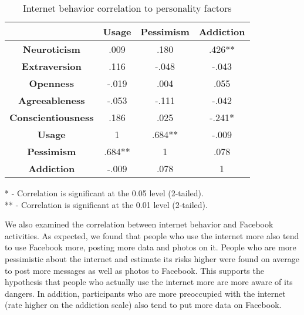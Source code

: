 \documentclass{sig-alternate}
\begin{document}
\begin{table}
\begin{center}
\begin{tabular}{|c|c|c|c|}
\hline
&  \textbf{Usage} & \textbf{Pessimism} & \textbf{Addiction} \\
\hline
\hline
\textbf{Neuroticism} &  .009	& .180	& .426**\\
\hline
\textbf{Extraversion} & .116	& -.048	& -.043\\
\hline
\textbf{Openness} & -.019	& .004	& .055  \\
\hline
\textbf{Agreeableness} & -.053	& -.111	& -.042\\
\hline
\textbf{Conscientiousness} &.186 &	.025	& -.241*\\
\hline
\textbf{Usage} & 1 &	.684** & -.009\\
\hline
\textbf{Pessimism} & .684**	& 1	& .078\\
\hline
\textbf{Addiction} & -.009 &	.078 &	1\\
\hline

\end{tabular}

\vspace{5mm}
* - Correlation is significant at the 0.05 level (2-tailed).\\
** - Correlation is significant at the 0.01 level (2-tailed).\\

\caption{Internet behavior correlation to personality factors}
\label{InternetOCEAN}
\end{center}
\end{table}

We also examined the correlation between internet behavior and Facebook activities. As expected, we found that people who use the internet more also tend to use Facebook more, posting more data and photos on it. People who are more pessimistic about the internet and estimate its risks higher were found on average to post more messages as well as photos to Facebook. This supports the hypothesis that people who actually use the internet more are more aware of its dangers. 
In addition, participants
who are more preoccupied with the internet (rate higher on the addiction scale) also tend to put more data on Facebook.
\end{document}

